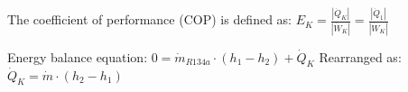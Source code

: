 The coefficient of performance (COP) is defined as:  
\( E_K = \frac{|\dot{Q}_K|}{|\dot{W}_K|} = \frac{|\dot{Q}_1|}{|\dot{W}_K|} \)  

Energy balance equation:  
\( 0 = \dot{m}_{R134a} \cdot (h_1 - h_2) + \dot{Q}_K \)  
Rearranged as:  
\( \dot{Q}_K = \dot{m} \cdot (h_2 - h_1) \)